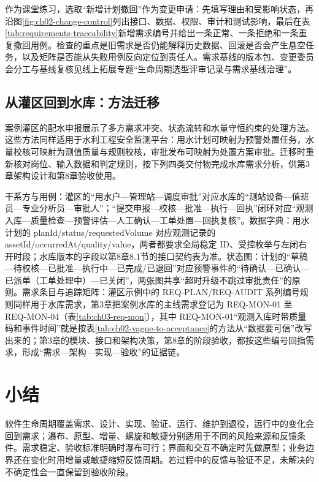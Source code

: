 作为课堂练习，选取“新增计划撤回”作为变更申请：先填写理由和受影响状态，再沿图\ref{fig:ch02-change-control}列出接口、数据、权限、审计和测试影响，最后在表\ref{tab:requirements-traceability}新增需求编号并给出一条正常、一条拒绝和一条重复撤回用例。检查的重点是旧需求是否仍能解释历史数据、回滚是否会产生悬空任务，以及矩阵是否能从失败用例反向定位到责任人。需求基线的版本包、变更委员会分工与基线复核见线上拓展专题“生命周期选型评审记录与需求基线治理”。

\subsection{从灌区回到水库：方法迁移}

案例灌区的配水申报展示了多方需求冲突、状态流转和水量守恒约束的处理方法。这些方法同样适用于水利工程安全监测平台：用水计划可映射为预警处置任务，水量校核可映射为测值质量与规则校核，审批发布可映射为处置方案审批。迁移时重新核对岗位、输入数据和判定规则，按下列四类交付物完成水库需求分析，供第3章架构设计和第8章验收使用。

干系方与用例：灌区的“用水户—管理站—调度审批”对应水库的“测站设备—值班员—专业分析员—审批人”；“提交申报—校核—批准—执行—回执”闭环对应“观测入库—质量检查—预警评估—人工确认—工单处置—回执复核”。数据字典：用水计划的 planId/status/requestedVolume 对应观测记录的 assetId/occurredAt/quality/value，两者都要求全局稳定 ID、受控枚举与左闭右开时段；水库版本的字段以第8章8.1节的接口契约表为准。状态图：计划的“草稿—待校核—已批准—执行中—已完成/已退回”对应预警事件的“待确认—已确认—已派单（工单处理中）—已关闭”，两张图共享“超时升级不跳过审批责任”的原则。需求条目与追踪矩阵：灌区示例中的 REQ-PLAN/REQ-AUDIT 系列编号规则同样用于水库需求，第3章把案例水库的主线需求登记为 REQ-MON-01 至 REQ-MON-04（表\ref{tab:ch03-req-mon}），其中 REQ-MON-01“观测入库时带质量码和事件时间”就是按表\ref{tab:ch02-vague-to-acceptance}的方法从“数据要可信”改写出来的；第3章的模块、接口和架构决策，第8章的阶段验收，都按这些编号回指需求，形成“需求—架构—实现—验收”的证据链。

\section*{小结}

软件生命周期覆盖需求、设计、实现、验证、运行、维护到退役，运行中的变化会回到需求；瀑布、原型、增量、螺旋和敏捷分别适用于不同的风险来源和反馈条件。需求稳定、验收标准明确时瀑布可行；界面和交互不确定时先做原型；业务边界还在变化时用增量或敏捷缩短反馈周期。若过程中的反馈与验证不足，未解决的不确定性会一直保留到验收阶段。

